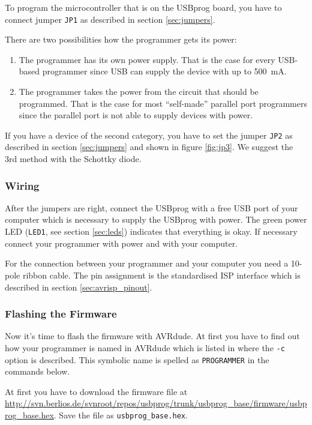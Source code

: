 \documentclass[bibtotoc,UKenglish,halfparskip,oneside,DIV12]{scrreprt}
\begin{document}
To program the microcontroller that is on the USBprog board, you have to connect jumper
\texttt{JP1} as described in section \vref{sec:jumpers}.

There are two possibilities how the programmer gets its power:

\begin{enumerate}
  \item The programmer has its own power supply. That is the case for every USB-based programmer
    since USB can supply the device with up to 500~mA.
  \item The programmer takes the power from the circuit that should be programmed. That is the case
    for most ``self-made'' parallel port programmers since the parallel port is not able to supply
    devices with power.
\end{enumerate}

If you have a device of the second category, you have to set the jumper \texttt{JP2} as described in
section \vref{sec:jumpers} and shown in figure \vref{fig:jp3}. We suggest the 3rd method with the
Schottky diode.

\subsubsection{Wiring}

After the jumpers are right, connect the USBprog with a free USB port of your computer which is
necessary to supply the USBprog with power. The green power LED (\texttt{LED1}, see section
\vref{sec:leds}) indicates that everything is okay. If necessary connect your programmer with power
and with your computer.

For the connection between your programmer and your computer you need a 10-pole ribbon cable. The
pin assignment is the standardised ISP interface which is described in section
\vref{sec:avrisp_pinout}.

\subsubsection{Flashing the Firmware}

Now it's time to flash the firmware with AVRdude. At first you have to find out how your programmer
is named in AVRdude which is listed in \cite{AVRdude} where the \texttt{-c} option is described.
This symbolic name is spelled as \texttt{PROGRAMMER} in the commands below.

At first you have to download the firmware file at
\url{http://svn.berlios.de/svnroot/repos/usbprog/trunk/usbprog\_base/firmware/usbprog\_base.hex}.
Save the file as \texttt{usbprog\_base.hex}.
\end{document}
